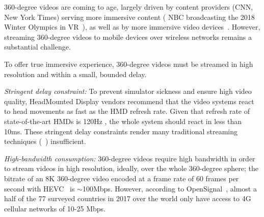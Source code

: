 
360-degree videos are coming to age, largely driven by content
providers (\eg CNN, New York Times) serving more immersive content (\eg 
NBC broadcasting the 2018 Winter Olympics in VR~\cite{NBC_olympic_360}), 
as well as 
by more immersive video 
devices~\cite{google_developers,facebook360,SUMSUNG_HEADSET}.
However, streaming 360-degree videos to mobile devices over wireless
networks remains a substantial challenge.

To offer true immersive experience, 360-degree videos must be streamed
in high resolution and within a small, bounded delay.

\begin{packeditemize}
\item {\em Stringent delay constraint:} 
To prevent simulator sickness \cite{Simulator_Sickness} and ensure high
video quality, HeadMounted Display vendors recommend that the video systems
react to head movements as fast as the HMD refresh rate.
Given that
refresh rate of state-of-the-art HMDs is 120Hz \cite{120fps},
the whole system should react in less than 10ms.
These stringent delay constraints render many traditional streaming 
techniques (\eg~\cite{MPEG-DASH}) insufficient.


\item {\em High-bandwidth consumption:}
360-degree videos require high bandwidth in order to stream videos in
high resolution, ideally, over the whole 360-degree sphere; \eg the 
bitrate of an 8K 360-degree video encoded at a frame rate of 60 
frames per second with HEVC~\cite{HEVC} is $\sim$100Mbps. However,
according to
OpenSignal~\cite{opensignal}, almost a half of the 77 surveyed 
countries in 2017 over the world only have access to 4G cellular 
networks of 10-25 Mbps.
\end{packeditemize}

